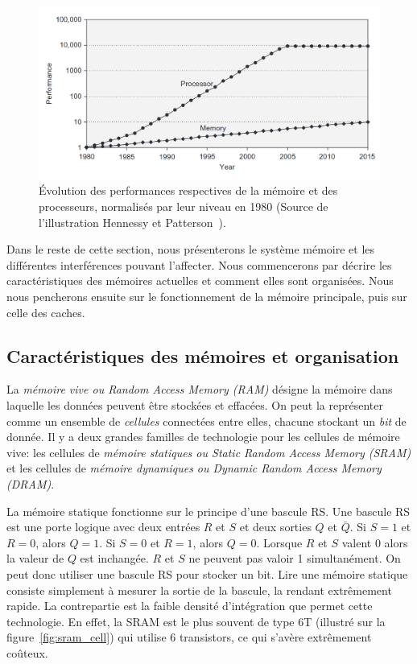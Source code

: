 \begin{figure}[!h]
	\includegraphics[width=\textwidth]{graphics/figures/gap_memory_processor.png}
	\caption{\label{fig:gap_memoire_processeur}Évolution des performances respectives de la mémoire et des processeurs, normalisés par leur niveau en 1980 (Source de l'illustration Hennessy et Patterson~\cite{hennessy2011computer}).}
\end{figure}

Dans le reste de cette section, nous présenterons le système mémoire et les différentes interférences pouvant l'affecter.
Nous commencerons par décrire les caractéristiques des mémoires actuelles et comment elles sont organisées.
Nous nous pencherons ensuite sur le fonctionnement de la mémoire principale, puis sur celle des caches.

\subsection{Caractéristiques des mémoires et organisation}

La \emph{mémoire vive ou Random Access Memory (RAM)} désigne la mémoire dans laquelle les données peuvent être stockées et effacées.
On peut la représenter comme un ensemble de \emph{cellules} connectées entre elles, chacune stockant un \emph{bit} de donnée.
Il y a deux grandes familles de technologie pour les cellules de mémoire vive: les cellules de \emph{mémoire statiques ou Static Random Access Memory (SRAM)} et les cellules de \emph{mémoire dynamiques ou Dynamic Random Access Memory (DRAM)}.

La mémoire statique fonctionne sur le principe d'une bascule RS.
Une bascule RS est une porte logique avec deux entrées $R$ et $S$ et deux sorties $Q$ et $\bar{Q}$.
Si $S=1$ et $R=0$, alors $Q=1$.
Si $S=0$ et $R=1$, alors $Q=0$.
Lorsque $R$ et $S$ valent 0 alors la valeur de $Q$ est inchangée.
$R$ et $S$ ne peuvent pas valoir 1 simultanément.
On peut donc utiliser une bascule RS pour stocker un bit.
Lire une mémoire statique consiste simplement à mesurer la sortie de la bascule, la rendant extrêmement rapide.
La contrepartie est la faible densité d'intégration que permet cette technologie.
En effet, la SRAM est le plus souvent de type 6T (illustré sur la figure~\ref{fig:sram_cell}) qui utilise 6 transistors, ce qui s'avère extrêmement coûteux.

